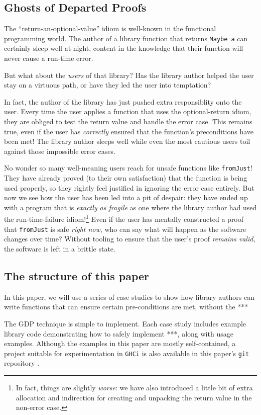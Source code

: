\documentclass[format=sigplan, review=false, screen=true]{acmart}
\begin{document}
\subsection{Ghosts of Departed Proofs}
The ``return-an-optional-value'' idiom is well-known in the functional programming world.
The author of a library function that returns \texttt{Maybe a} can certainly sleep well
at night, content in the knowledge that their function will never cause a run-time error.

But what about the \emph{users} of that library? Has the library author helped the user stay
on a virtuous path, or have they led the user into temptation?

In fact, the author of the library has just pushed extra responsiblity onto the user.
Every time the user applies a function that uses the optional-return idiom, they are obliged
to test the return value and handle the error case. This remains true, even if the user
has \emph{correctly} ensured that the function's preconditions have been met! The library
author sleeps well while even the most cautious users toil against those impossible error cases.

No wonder so many well-meaning users reach for unsafe functions like \texttt{fromJust}!
They have already proved (to their own satisfaction) that the function is being used properly, so they rightly
feel justified in ignoring the error case entirely. But now we see how the user has been led into
a pit of despair: they have ended up with a program that is \emph{exactly as fragile} as one where the library
author had used the run-time-failure idiom!\footnote{In fact, things are slightly \emph{worse}: we have also introduced a little
bit of extra allocation and indirection for creating and unpacking the return value in the non-error case.}
Even if the user has mentally constructed a proof that \texttt{fromJust} is safe \emph{right now}, who can say what will
happen as the software changes over time? Without tooling to ensure that the user's proof \emph{remains valid},
the software is left in a brittle state.

\subsection{The structure of this paper}
In this paper, we will use a series of case studies to show how library authors can write
functions that can ensure certain pre-conditions are met, without the  ***

The GDP technique is simple to implement. Each case study includes example library code
demonstrating how to safely implement ***, along with usage examples. Although the
examples in this paper are mostly self-contained, a project suitable for experimentation in
\texttt{GHCi} is also available in this paper's \texttt{git} repository \cite{this}.
\end{document}
